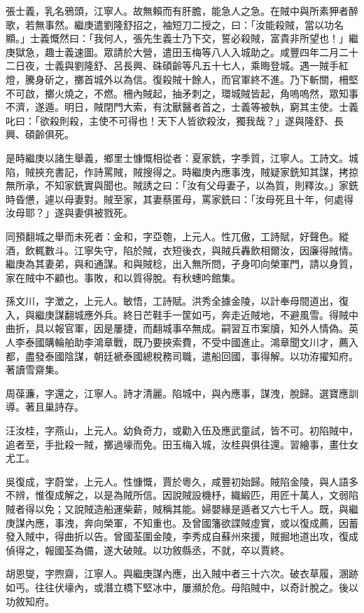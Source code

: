 \begin{pinyinscope}
張士義，乳名鴉頭，江寧人。故無賴而有肝膽，能急人之急。在賊中與所素狎者醉歌，若無事然。繼庚遣劉隆舒招之，袖短刀二授之，曰：「汝能殺賊，當以功名顯。」士義慨然曰：「我何人，張先生義士乃下交，誓必殺賊，富貴非所望也！」繼庚獄急，趣士義速圖。眾請於大營，遣田玉梅等八人入城助之。咸豐四年二月二十二日夜，士義與劉隆舒、呂長興、硃碩齡等凡五十七人，乘晦登城。遇一賊手紅燈，騰身斫之，擲首城外以為信。復殺賊十餘人，而官軍終不進。乃下斬關，柵堅不可啟，擲火燒之，不燃。柵內賊起，抽矛刺之，環城賊皆起，角嗚嗚然，眾知事不濟，遂遁。明日，賊閉門大索，有沈獸醫者首之，士義等被執，窮其主使。士義叱曰：「欲殺則殺，主使不可得也！天下人皆欲殺汝，獨我哉？」遂與隆舒、長興、碩齡俱死。

是時繼庚以諸生舉義，鄉里士慷慨相從者：夏家銑，字季質，江寧人。工詩文。城陷，賊挾充書記，作詩罵賊，賊搜得之。時繼庚內應事洩，賊疑家銑知其謀，拷掠無所承，不知家銑實與聞也。賊誘之曰：「汝有父母妻子，以為質，則釋汝。」家銑時昏憊，遽以母妻對。賊至家，其妻蔡匿母，罵家銑曰：「汝母死且十年，何處得汝母耶？」遂與妻俱被戮死。

同預翻城之舉而未死者：金和，字亞匏，上元人。性兀傲，工詩賦，好聲色。縱酒，飲輒數斗。江寧失守，陷於賊，衣短後衣，與賊兵轟飲相爾汝，因廉得賊情。繼庚為其妻弟，與和通謀。和與賊稔，出入無所問，孑身叩向榮軍門，請以身質，家在賊中不顧也。事敗，和以質得脫。有秋蟪吟館集。

孫文川，字澂之，上元人。敏悟，工詩賦。洪秀全據金陵，以計奉母間道出，復入，與繼庚謀翻城應外兵。終日芒鞋手一筐如丐，奔走近賊地，不避風雪。得賊中曲折，具以報官軍，因是屢捷，而翻城事卒無成。嗣習互市案牘，知外人情偽。英人李泰國購輪舶助李鴻章戰，既乃要挾索費，不受中國進止。鴻章聞文川才，薦入都，盡發泰國陰謀，朝廷褫泰國總稅務司職，遣船回國，事得解。以功洊擢知府。著讀雪齋集。

周葆濂，字還之，江寧人。詩才清麗。陷城中，與內應事，謀洩，脫歸。選寶應訓導。著且巢詩存。

汪汝桂，字燕山，上元人。幼負奇力，或勸入伍及應武童試，皆不可。初陷賊中，追者至，手批殺一賊，擲過壕而免。田玉梅入城，汝桂與俱往還。習繪事，畫仕女尤工。

吳復成，字蔚堂，上元人。性慷慨，賈於粵久，咸豐初始歸。賊陷金陵，與人語多不辨，惟復成解之，以是為賊所信。因說賊設機杼，織緞匹，用匠十萬人，文弱陷賊者得以免；又說賊造船運柴薪，賊稱其能。婦嬰緣是遁者又六七千人。既，與繼庚謀內應，事洩，奔向榮軍，不知重也。及曾國籓欲諜賊虛實，或以復成薦，因蓄發入賊中，得曲折以告。曾國荃圍金陵，李秀成自蘇州來援，賊掘地道出攻，復成偵得之，報國荃為備，遂大破賊。以功敘縣丞，不就，卒以賈終。

胡恩燮，字煦齋，江寧人。與繼庚謀內應，出入賊中者三十六次。破衣草履，溷跡如丐。往往伏壕內，或潛立橋下堅冰中，屢瀕於危。母陷賊中，以奇計脫之。後以功敘知府。


\end{pinyinscope}
